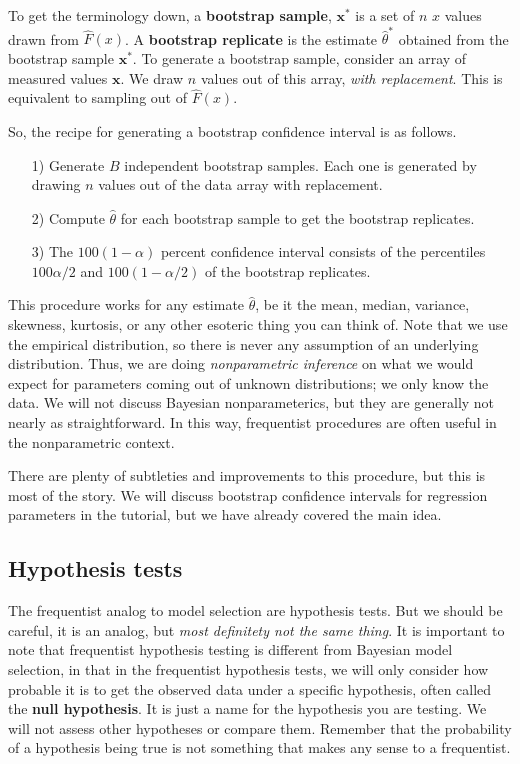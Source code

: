 To get the terminology down, a \textbf{bootstrap sample}, $\mathbf{x}^*$ is a set of $n$ $x$ values drawn from $\hat{F}(x)$. A \textbf{bootstrap replicate} is the estimate $\hat{\theta}^*$ obtained from the bootstrap sample $\mathbf{x}^*$. To generate a bootstrap sample, consider an array of measured values $\mathbf{x}$. We draw $n$ values out of this array, \textit{with replacement}. This is equivalent to sampling out of $\hat{F}(x)$.

So, the recipe for generating a bootstrap confidence interval is as follows.
\begin{enumerate}
    \item[1)] Generate $B$ independent bootstrap samples. Each one is generated by drawing $n$ values out of the data array with replacement.
    \item[2)] Compute $\hat{\theta}$ for each bootstrap sample to get the bootstrap replicates.
    \item[3)] The $100 (1-\alpha)$ percent confidence interval consists of the percentiles $100\alpha/2$ and $100(1-\alpha/2)$ of the bootstrap replicates.
\end{enumerate}

This procedure works for any estimate $\hat{\theta}$, be it the mean, median, variance, skewness, kurtosis, or any other esoteric thing you can think of. Note that we use the empirical distribution, so there is never any assumption of an underlying distribution. Thus, we are doing \textit{nonparametric inference} on what we would expect for parameters coming out of unknown distributions; we only know the data. We will not discuss Bayesian nonparameterics, but they are generally not nearly as straightforward. In this way, frequentist procedures are often useful in the nonparametric context.

There are plenty of subtleties and improvements to this procedure, but this is most of the story. We will discuss bootstrap confidence intervals for regression parameters in the tutorial, but we have already covered the main idea.


\subsection{Hypothesis tests}
The frequentist analog to model selection are hypothesis tests. But we should be careful, it is an analog, but \textit{most definitety not the same thing}. It is important to note that frequentist hypothesis testing is different from Bayesian model selection, in that in the frequentist hypothesis tests, we will only consider how probable it is to get the observed data under a specific hypothesis, often called the \textbf{null hypothesis}. It is just a name for the hypothesis you are testing. We will not assess other hypotheses or compare them. Remember that the probability of a hypothesis being true is not something that makes any sense to a frequentist.

